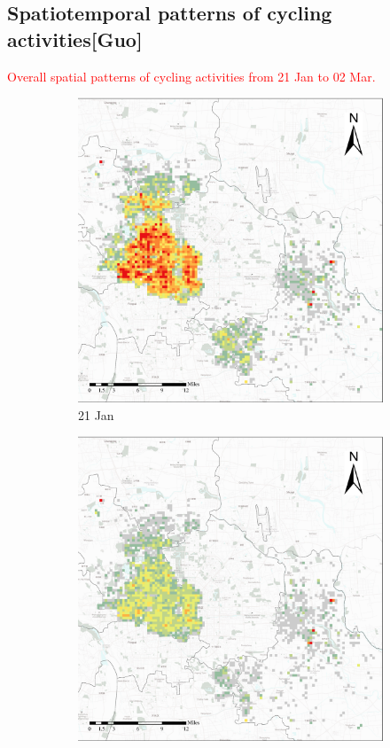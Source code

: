 \documentclass[preprints,ijgi,submit,moreauthors]{Definitions/mdpi}
\begin{document}
\subsection{Spatiotemporal patterns of cycling activities\textbf{[Guo]}}

\textcolor{red}{Overall spatial patterns of cycling activities from 21 Jan to 02 Mar.}

\begin{figure}[H]
    \centering
    \begin{subfigure}{.23\textwidth}
        \includegraphics[width=\textwidth]{Figures/Overall_spatial_patterns/FN5_D2020_01_21.eps}
        \caption{21 Jan}
    \end{subfigure}
    \begin{subfigure}{.23\textwidth}
        \includegraphics[width=\textwidth]{Figures/Overall_spatial_patterns/FN5_D2020_01_25.eps}

\end{subfigure}
\end{figure}
\end{document}
